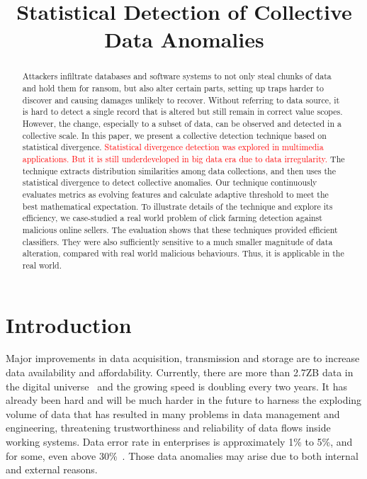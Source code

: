 \documentclass[10pt,conference,letterpaper]{article}
\title{Statistical Detection of Collective Data Anomalies}
\date{}
\begin{document}
\maketitle
%
	\begin{abstract} 
		Attackers infiltrate databases and software systems to not only steal chunks of data and hold them for ransom, but also alter certain parts, setting up traps harder to discover and causing damages unlikely to recover.
		Without referring to data source, it is hard to detect a single record that is altered but still remain in correct value scopes. However, the change, especially to a subset of data, can be observed and detected in a collective scale. 
		In this paper, we present a collective detection technique based on statistical divergence. \textcolor{red}{Statistical divergence detection was explored in multimedia applications. But it is still underdeveloped in big data era due to data irregularity.} The technique extracts distribution similarities among data collections, and then uses the statistical divergence to detect collective anomalies.
		Our technique continuously evaluates metrics as evolving features and calculate adaptive threshold to meet the best mathematical expectation.
		To illustrate details of the technique and explore its efficiency, we case-studied a real world problem of click farming detection against malicious online sellers. The evaluation shows that these techniques provided efficient classifiers. They were also sufficiently sensitive to a much smaller magnitude of data alteration, compared with real world malicious behaviours. Thus, it is applicable in the real world. 
	\end{abstract}

%
	\section{Introduction}
		Major improvements in data acquisition, transmission and storage are to increase data availability and affordability. Currently, there are more than 2.7ZB data in the digital universe~\cite{bigDataStatistics} and the growing speed is doubling every two years.
		It has already been hard and will be much harder in the future to harness the exploding volume of data that has resulted in many problems in data management and engineering, threatening trustworthiness and reliability of data flows inside working systems.
		Data error rate in enterprises is approximately 1\% to 5\%, and for some, even above 30\%~\cite{saha2014data}. Those data anomalies may arise due to both internal and external reasons. 
		
\end{document}
